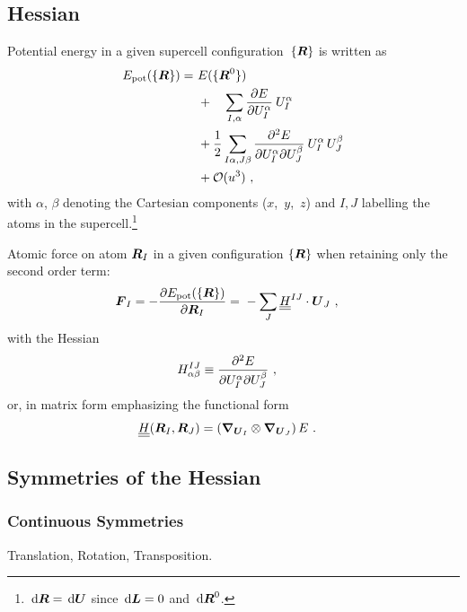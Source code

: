 \subsection{Hessian}
\nid Potential energy in a given supercell \mbox{configuration 
$\{\boldsymbol{R}\}$}
is written as
\begin{align}
\begin{split}
E_{\text{pot}} (\{\boldsymbol{R}\}) 
=&~ E (\{\boldsymbol{R}^0\}) \\
&~+ \quad \sum_{I, \alpha} \frac{\partial E}{\partial U_I^\alpha} \: U_I^\alpha \\
&~+ \frac{1}{2} \sum_{I \alpha, J \beta} 
\frac{\partial^2 E}{\partial U_I^\alpha \partial U_J^\beta} \:
U_I^\alpha \, U_J^\beta \\
&~+ \mathcal{O}(u^3)~, \nonumber
\end{split}
\end{align}
with $\alpha$, $\beta$ denoting the Cartesian components \mbox{($x$, $y$, $z$)} 
and $I,J$ labelling the atoms in the supercell.\footnote{
	$\,\text{d} \boldsymbol{R} = \,\text{d} \boldsymbol{U}$ since $\,\text{d} \boldsymbol{L} = 0$ and $\,\text{d} \boldsymbol{R}^0$.}

Atomic force on atom $\boldsymbol{R}_I$ in a given configuration $\{\boldsymbol{R}\}$ when 
retaining only the second order term:
\begin{align}
\begin{split}
\boldsymbol{F}_I = - \frac{\partial E_{\text{pot}} (\{\boldsymbol{R}\})}{\partial \boldsymbol{R}_I}
=&~ - \sum_J \underline{\underline{{H}}}^{IJ} \cdot \boldsymbol{U}_J~,
\end{split}
\end{align}
with the Hessian
\begin{align}
\begin{split}
	H^{IJ}_{\alpha \beta} &\equiv 
	\frac{\partial^2 E}{\partial U_I^\alpha \partial U_J^\beta}~,
	\label{eq:Hessian1}
\end{split}
\end{align}
or, in matrix form emphasizing the functional form
\begin{align}
\begin{split}
\underline{\underline{{H}}} (\boldsymbol{R}_I, \boldsymbol{R}_J) &= 
\left(\boldsymbol{\nabla}_{\boldsymbol{U}_I} \otimes \boldsymbol{\nabla}_{\boldsymbol{U}_J}\right) E~.
\label{eq:Hessian1}
\end{split}
\end{align}

\subsection{Symmetries of the Hessian}
\subsubsection{Continuous Symmetries}
Translation, Rotation, Transposition.

